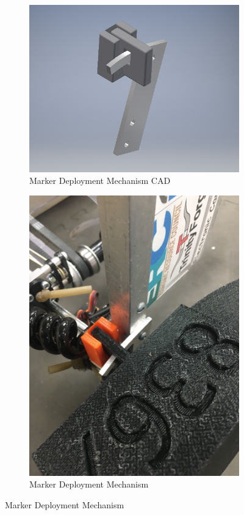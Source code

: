 \documentclass{article}
\begin{document}
\begin{figure}[h!]
\centering
\begin{subfigure}{.45\textwidth}
  \centering
  \includegraphics[width=1\textwidth]{29_03-18/images/marker.png}
  \caption{Marker Deployment Mechanism CAD}
  \label{fig:MDM}
 \end{subfigure}
\begin{subfigure}{.45\textwidth}
  \centering
  \includegraphics[width=.75\textwidth]{29_03-18/images/thing.jpg}
  \caption{Marker Deployment Mechanism}
  \label{fig:hub}
  \end{subfigure}
  \caption{Marker Deployment Mechanism}
  \end{figure}
\end{document}

